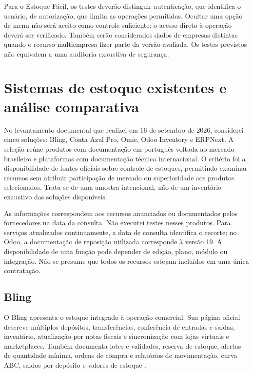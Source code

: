 Para o Estoque Fácil, os testes deverão distinguir autenticação, que identifica o usuário, de autorização, que limita as operações permitidas. Ocultar uma opção de menu não será aceito como controle suficiente: o acesso direto à operação deverá ser verificado. Também serão considerados dados de empresas distintas quando o recurso multiempresa fizer parte da versão avaliada. Os testes previstos não equivalem a uma auditoria exaustiva de segurança.

\section{Sistemas de estoque existentes e análise comparativa}
\label{sec:mercado}

No levantamento documental que realizei em 16 de setembro de 2026, considerei cinco soluções: Bling, Conta Azul Pro, Omie, Odoo Inventory e ERPNext. A seleção reúne produtos com documentação em português voltada ao mercado brasileiro e plataformas com documentação técnica internacional. O critério foi a disponibilidade de fontes oficiais sobre controle de estoques, permitindo examinar recursos sem atribuir participação de mercado ou superioridade aos produtos selecionados. Trata-se de uma amostra intencional, não de um inventário exaustivo das soluções disponíveis.

As informações correspondem aos recursos anunciados ou documentados pelos fornecedores na data da consulta. Não executei testes nesses produtos. Para serviços atualizados continuamente, a data de consulta identifica o recorte; no Odoo, a documentação de reposição utilizada corresponde à versão 19. A disponibilidade de uma função pode depender de edição, plano, módulo ou integração. Não se presume que todos os recursos estejam incluídos em uma única contratação.

\subsection{Bling}

O Bling apresenta o estoque integrado à operação comercial. Sua página oficial descreve múltiplos depósitos, transferências, conferência de entradas e saídas, inventário, atualização por notas fiscais e sincronização com lojas virtuais e marketplaces. Também documenta lotes e validades, reserva de estoque, alertas de quantidade mínima, ordens de compra e relatórios de movimentação, curva ABC, saldos por depósito e valores de estoque \cite{BlingEstoque}.

